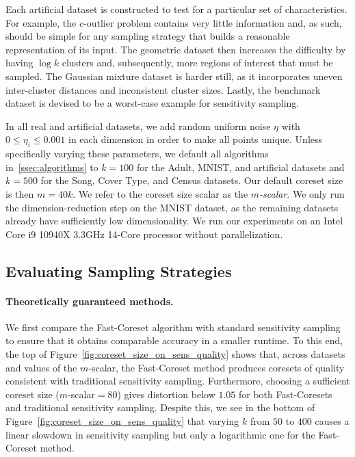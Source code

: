 Each artificial dataset is constructed to test for a particular set of characteristics. For example, the $c$-outlier problem contains very little information
and, as such, should be simple for any sampling strategy that builds a reasonable representation of its input. The geometric dataset then increases the
difficulty by having $\log k$ clusters and, subsequently, more regions of interest that must be sampled. The Gaussian mixture dataset is harder still, as it
incorporates uneven inter-cluster distances and inconsistent cluster sizes. Lastly, the benchmark dataset is devised to be a worst-case example for sensitivity
sampling.

In all real and artificial datasets, we add random uniform noise $\eta$ with $0 \leq \eta_i \leq 0.001$ in each dimension in order to make all points unique.
Unless specifically varying these parameters, we default all algorithms in~\ref{ssec:algorithms} to $k=100$ for the Adult, MNIST, and artificial datasets and
$k=500$ for the Song, Cover Type, and Census datasets. Our default coreset size is then $m = 40k$. We refer to the coreset size scalar as the \emph{$m$-scalar}.
We only run the dimension-reduction step on the MNIST dataset, as the remaining datasets already have sufficiently low dimensionality. We run our experiments on
an Intel Core i9 10940X 3.3GHz 14-Core processor without parallelization.

\subsection{Evaluating Sampling Strategies}
\label{ssec:alg_qualities}

\paragraph*{Theoretically guaranteed methods.}



We first compare the Fast-Coreset algorithm with standard sensitivity sampling to ensure that it obtains comparable accuracy in a smaller runtime.  To this end,
the top of Figure~\ref{fig:coreset_size_on_sens_quality} shows that, across datasets and values of the $m$-scalar, the Fast-Coreset method produces coresets of
quality consistent with traditional sensitivity sampling. Furthermore, choosing a sufficient coreset size ($m$-scalar$=80$) gives distortion below $1.05$ for
both Fast-Coresets and traditional sensitivity sampling. Despite this, we see in the bottom of Figure~\ref{fig:coreset_size_on_sens_quality} that varying $k$
from $50$ to $400$ causes a linear slowdown in sensitivity sampling but only a logarithmic one for the Fast-Coreset method.


